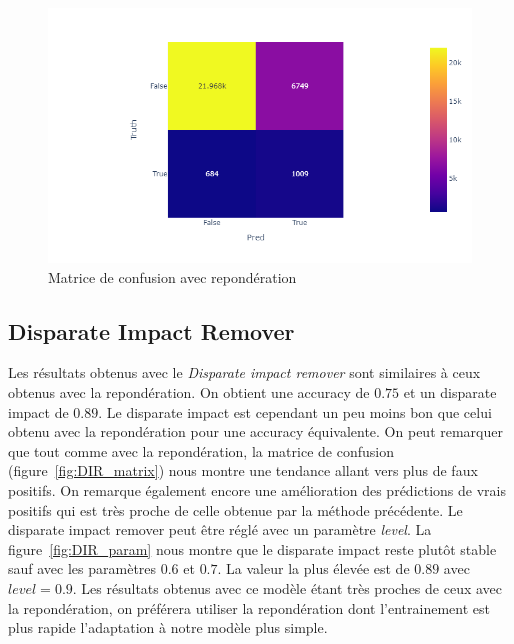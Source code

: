\documentclass{article}
\begin{document}
    \begin{figure}[h]
        \centering
        \includegraphics[scale=0.4]{./img/confusion_matrix_reweight.png}
        \caption{Matrice de confusion avec repondération}
        \label{fig:reweight_matrix}
    \end{figure}

    \subsection{Disparate Impact Remover}
    Les résultats obtenus avec le \textit{Disparate impact remover} sont similaires à ceux obtenus avec 
    la repondération. On obtient une accuracy de $0.75$ et un disparate impact de $0.89$. Le disparate 
    impact est cependant un peu moins bon que celui obtenu avec la repondération pour une accuracy équivalente.
    On peut remarquer que tout comme avec la repondération, la matrice de confusion (figure~\ref{fig:DIR_matrix})
    nous montre une tendance allant vers plus de faux positifs. On remarque également encore une amélioration
    des prédictions de vrais positifs qui est très proche de celle obtenue par la méthode précédente.
    Le disparate impact remover peut être réglé avec un paramètre \textit{level}. La figure~\ref{fig:DIR_param} 
    nous montre que le disparate impact reste plutôt stable sauf avec les paramètres $0.6$ et $0.7$.
    La valeur la plus élevée est de $0.89$ avec $level=0.9$. Les résultats obtenus avec ce modèle étant très proches 
    de ceux avec la repondération, on préférera utiliser la repondération dont l'entrainement est plus rapide l'adaptation 
    à notre modèle plus simple.
\end{document}
